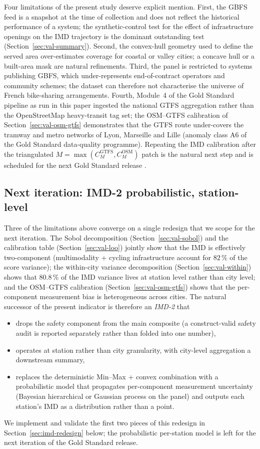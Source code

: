 \documentclass[11pt,a4paper]{article}
\begin{document}
Four limitations of the present study deserve explicit mention.
First, the GBFS feed is a snapshot at the time of collection and
does not reflect the historical performance of a system; the
synthetic-control test for the effect of infrastructure openings
on the IMD trajectory is the dominant outstanding test
(Section~\ref{sec:val-summary}). Second, the convex-hull
geometry used to define the served area over-estimates coverage
for coastal or valley cities; a concave hull or a built-area
mask are natural refinements. Third, the panel is restricted to
systems publishing GBFS, which under-represents end-of-contract
operators and community schemes; the dataset can therefore not
characterise the universe of French bike-sharing arrangements.
Fourth, Module~4 of the Gold Standard pipeline as run in this
paper ingested the national GTFS aggregation rather than the
OpenStreetMap heavy-transit tag set; the OSM--GTFS calibration
of Section~\ref{sec:val-osm-gtfs} demonstrates that the GTFS
route under-covers the tramway and metro networks of Lyon,
Marseille and Lille (anomaly class A6 of the Gold Standard
data-quality programme). Repeating the IMD calibration after the
triangulated $M = \max(C_M^{\text{GTFS}}, C_M^{\text{OSM}})$
patch is the natural next step and is scheduled for the next
Gold Standard release \citep{Fosse2026gold}.

\subsection{Next iteration: IMD-2 probabilistic, station-level}
\label{sec:future-work}

Three of the limitations above converge on a single redesign
that we scope for the next iteration. The Sobol decomposition
(Section~\ref{sec:val-sobol}) and the calibration table
(Section~\ref{sec:val-loo}) jointly show that the IMD is
effectively two-component (multimodality + cycling
infrastructure account for $82\,\%$ of the score variance);
the within-city variance decomposition
(Section~\ref{sec:val-within}) shows that $80.8\,\%$ of the
IMD variance lives at station level rather than city level; and
the OSM--GTFS calibration (Section~\ref{sec:val-osm-gtfs})
shows that the per-component measurement bias is heterogeneous
across cities. The natural successor of the present indicator is
therefore an \emph{IMD-2} that
\begin{itemize}
\item drops the safety component from the main composite (a
construct-valid safety audit is reported separately rather than
folded into one number),
\item operates at station rather than city granularity, with
city-level aggregation a downstream summary,
\item replaces the deterministic Min--Max + convex combination
with a probabilistic model that propagates per-component
measurement uncertainty (Bayesian hierarchical or Gaussian
process on the panel) and outputs each station's IMD as a
distribution rather than a point.
\end{itemize}
We implement and validate the first two pieces of this
redesign in Section~\ref{sec:imd-redesign} below; the
probabilistic per-station model is left for the next iteration
of the Gold Standard release.
\end{document}
